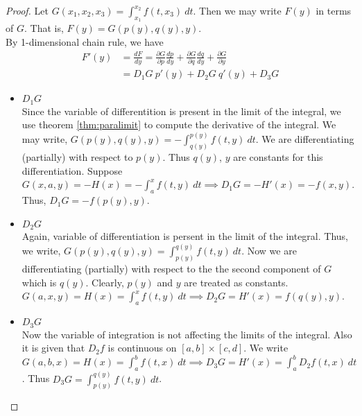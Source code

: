 \begin{proof}
	Let $G(x_1,x_2,x_3) = \int_{x_1}^{x_2} f(t,x_3)\ dt$. Then we may write $F(y)$ in terms of $G$. That is, $F(y) = G(p(y),q(y),y)$.\\

	By 1-dimensional chain rule, we have 
	\begin{align*}
		F'(y) & = \frac{dF}{dy} = \frac{\partial G}{\partial p} \frac{dp}{dy} + \frac{\partial G}{\partial q} \frac{dq}{dy} + \frac{\partial G}{\partial y} \\
		& = D_1 G\ p'(y) + D_2 G\ q'(y) + D_3 G
	\end{align*}

	\begin{itemize}
		\item $D_1 G$ \\
			Since the variable of differentition is present in the limit of the integral, we use theorem \ref{thm:paralimit} to compute the derivative of the integral. We may write, $G(p(y),q(y),y)  = -\int_{q(y)}^{p(y)} f(t,y)\ dt$. We are differentiating (partially) with respect to $p(y)$. Thus $q(y)$, $y$ are constants for this differentiation. Suppose $G(x,a,y) = -H(x) = -\int_a^x f(t,y)\ dt \implies D_1 G = -H'(x)= -f(x,y)$. Thus, $D_1 G = -f(p(y),y)$.
		\item $D_2 G$ \\
			Again, variable of differentiation is persent in the limit of the integral. Thus, we write, $G(p(y),q(y),y) = \int_{p(y)}^{q(y)} f(t,y)\ dt$. Now we are differentiating (partially) with respect to the the second component of $G$ which is $q(y)$. Clearly, $p(y)$ and $y$ are treated as constants. $G(a,x,y) = H(x) = \int_a^x f(t,y)\ dt \implies D_2 G = H'(x) = f(q(y),y)$.
		\item $D_3 G$ \\
			Now the variable of integration is not affecting the limits of the integral. Also it is given that $D_2 f$ is continuous on $[a,b] \times [c,d]$. We write $G(a,b,x) = H(x) = \int_a^b f(t,x)\ dt \implies D_3 G = H'(x) = \int_a^b D_2 f(t,x)\ dt$. Thus $D_3 G = \int_{p(y)}^{q(y)} f(t,y)\ dt$.
	\end{itemize}
\end{proof}

